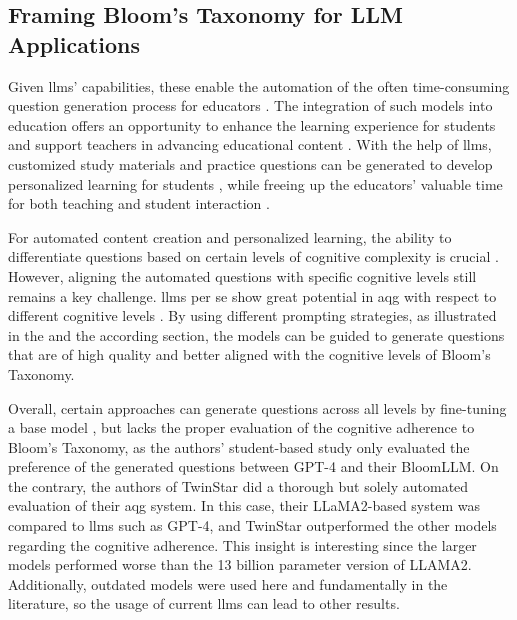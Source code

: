 \vspace{8em}\pagebreak

\subsection{Framing Bloom's Taxonomy for LLM Applications} \label{sec:blooms-taxonomy}

Given \acp{llm}' capabilities, these enable the automation of the often time-consuming question generation process for educators \cite{vu_chatgpt-based_2024}. The integration of such models into education offers an opportunity to enhance the learning experience for students and support teachers in advancing educational content \cite{naveed_comprehensive_2024}. 
With the help of \acp{llm}, customized study materials and practice questions can be generated to develop personalized learning for students \cite{al_faraby_analysis_2024,bhowmick_automating_2023,hang_mcqgen_2024}, while freeing up the educators' valuable time for both teaching and student interaction \cite{naveed_comprehensive_2024}.

 For automated content creation and personalized learning, the ability to differentiate questions based on certain levels of cognitive complexity is crucial \cite{li_planning_2024,zhuge_twinstar_2025}. However, aligning the automated questions with specific cognitive levels still remains a key challenge. \acp{llm} per se show great potential in \ac{aqg} with respect to different cognitive levels \cite{maity_can_2025,blobstein_angel_2023,duong-trung_bloomllm_2024,scaria_automated_2024,scaria_how_2024}. 
By using different prompting strategies, as illustrated in the  and the according  section, the models can be guided to generate questions that are of high quality and better aligned with the cognitive levels of Bloom's Taxonomy. 

Overall, certain approaches can generate questions across all levels by fine-tuning a base model \cite{duong-trung_bloomllm_2024,zhuge_twinstar_2025}, but \cite{duong-trung_bloomllm_2024} lacks the proper evaluation of the cognitive adherence to Bloom's Taxonomy, as the authors' student-based study only evaluated the preference of the generated questions between GPT-4 and their BloomLLM. On the contrary, the authors of TwinStar \cite{zhuge_twinstar_2025} did a thorough but solely automated evaluation of their \ac{aqg} system. In this case, their LLaMA2-based system was compared to \acp{llm} such as GPT-4, and TwinStar outperformed the other models regarding the cognitive adherence. This insight is interesting since the larger models performed worse than the 13 billion parameter version of LLAMA2. Additionally, outdated models were used here and fundamentally in the literature, so the usage of current \acp{llm} can lead to other results. 

